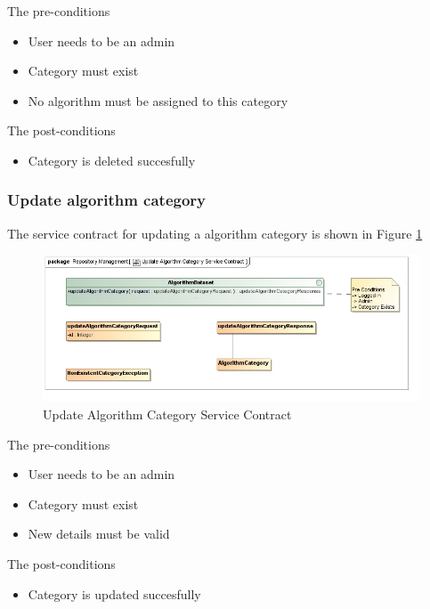 The pre-conditions
\begin{itemize}
  \item User needs to be an admin
  \item Category must exist
  \item No algorithm must be assigned to this category
\end{itemize}

The post-conditions
\begin{itemize}
  \item Category is deleted succesfully
\end{itemize}

\subsubsection {Update algorithm category}

The service contract for updating a algorithm category is shown in Figure \ref{fig:updateAlgorithmCatService}
\begin{figure}[H]
  \begin{center}
  \includegraphics[scale=0.6]{../Diagrams and Charts/Test Data/Update Algorithm Category Service Contract.jpg}
  \caption{Update Algorithm Category Service Contract}
  \label{fig:updateAlgorithmCatService}
  \end{center}
  
\end{figure}


The pre-conditions
\begin{itemize}
  \item User needs to be an admin
  \item Category must exist
  \item New details must be valid
\end{itemize}

The post-conditions
\begin{itemize}
  \item Category is updated succesfully
\end{itemize}
